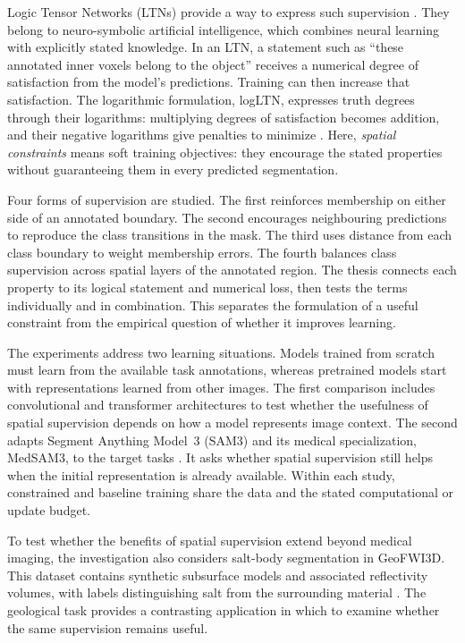 \documentclass[12pt,a4paper]{article}
\begin{document}
Logic Tensor Networks (LTNs) provide a way to express such supervision
\cite{badreddine2022logic}. They belong to neuro-symbolic artificial
intelligence, which combines neural learning with explicitly stated
knowledge. In an LTN, a statement such as ``these annotated inner voxels
belong to the object'' receives a numerical degree of satisfaction from
the model's predictions. Training can then increase that satisfaction.
The logarithmic formulation, logLTN, expresses truth degrees through
their logarithms: multiplying degrees of satisfaction becomes addition,
and their negative logarithms give penalties to minimize
\cite{badreddine2023logltn}. Here, \emph{spatial constraints}
means soft training objectives: they encourage the stated properties
without guaranteeing them in every predicted segmentation.

Four forms of supervision are studied. The first reinforces membership
on either side of an annotated boundary. The second encourages
neighbouring predictions to reproduce the class transitions in the mask.
The third uses distance from each class boundary to weight membership
errors. The fourth balances class supervision across spatial layers of
the annotated region. The thesis connects each property to its logical
statement and numerical loss, then tests the terms individually and in
combination. This separates the formulation of a useful constraint from
the empirical question of whether it improves learning.

The experiments address two learning situations. Models trained from
scratch must learn from the available task annotations, whereas pretrained
models start with representations learned from other images. The first
comparison includes convolutional and transformer architectures to test
whether the usefulness of spatial supervision depends on how a model
represents image context. The second adapts Segment Anything Model~3
(SAM3) and its medical specialization, MedSAM3, to the target tasks \cite{carion2025sam3,liu2025medsam3}. It asks whether
spatial supervision still helps when the initial representation is
already available. Within each study, constrained and baseline training
share the data and the stated computational or update budget.

To test whether the benefits of spatial supervision extend beyond medical
imaging, the investigation also considers salt-body segmentation in
GeoFWI3D. This dataset contains synthetic subsurface models and associated
reflectivity volumes, with labels distinguishing salt from the surrounding
material \cite{swaminadhan2026geofwi3d}. The geological task provides a
contrasting application in which to examine whether the same supervision
remains useful.
\end{document}
